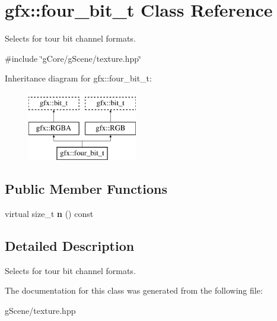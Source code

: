 \hypertarget{classgfx_1_1four__bit__t}{\section{gfx\-:\-:four\-\_\-bit\-\_\-t Class Reference}
\label{classgfx_1_1four__bit__t}
}


Selects for tour bit channel formats.  




{\ttfamily \#include \char`\"{}g\-Core/g\-Scene/texture.\-hpp\char`\"{}}

Inheritance diagram for gfx\-:\-:four\-\_\-bit\-\_\-t\-:\begin{figure}[H]
\begin{center}
\leavevmode
\includegraphics[height=3.000000cm]{classgfx_1_1four__bit__t}
\end{center}
\end{figure}
\subsection*{Public Member Functions}
\begin{DoxyCompactItemize}
\item 
\hypertarget{classgfx_1_1four__bit__t_a4ca51b6edea0b30a335a45d8f7eb3685}{virtual size\-\_\-t {\bfseries n} () const }\label{classgfx_1_1four__bit__t_a4ca51b6edea0b30a335a45d8f7eb3685}

\end{DoxyCompactItemize}


\subsection{Detailed Description}
Selects for tour bit channel formats. 

The documentation for this class was generated from the following file\-:\begin{DoxyCompactItemize}
\item 
g\-Scene/texture.\-hpp\end{DoxyCompactItemize}
